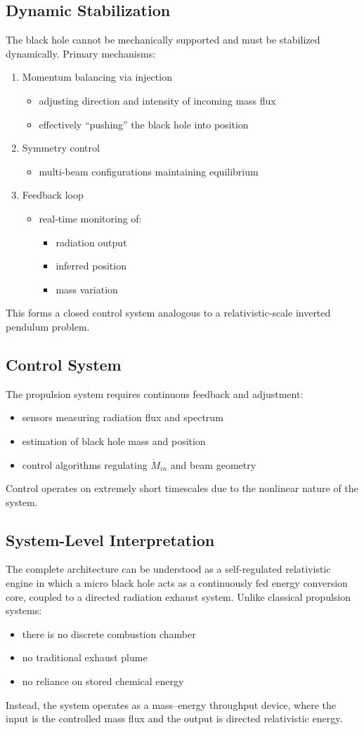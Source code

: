 \documentclass[conference]{IEEEtran}
\begin{document}
\subsection{Dynamic Stabilization}
The black hole cannot be mechanically supported and must be stabilized dynamically.
Primary mechanisms:
\begin{enumerate}
\item Momentum balancing via injection\begin{itemize}\item adjusting direction and intensity of incoming mass flux\item effectively “pushing” the black hole into position\end{itemize}
\item Symmetry control\begin{itemize}\item multi-beam configurations maintaining equilibrium\end{itemize}
\item Feedback loop\begin{itemize}\item real-time monitoring of:\begin{itemize}\item radiation output\item inferred position\item mass variation\end{itemize}\end{itemize}
\end{enumerate}
This forms a closed control system analogous to a relativistic-scale inverted pendulum problem.
\subsection{Control System}
The propulsion system requires continuous feedback and adjustment:
\begin{itemize}
\item sensors measuring radiation flux and spectrum
\item estimation of black hole mass and position
\item control algorithms regulating \( \dot{M}_{in} \) and beam geometry
\end{itemize}
Control operates on extremely short timescales due to the nonlinear nature of the system.
\subsection{System-Level Interpretation}
The complete architecture can be understood as a self-regulated relativistic engine in which a micro black hole acts as a continuously fed energy conversion core, coupled to a directed radiation exhaust system. Unlike classical propulsion systems:
\begin{itemize}
\item there is no discrete combustion chamber
\item no traditional exhaust plume
\item no reliance on stored chemical energy
\end{itemize}
Instead, the system operates as a mass–energy throughput device, where the input is the controlled mass flux and the output is directed relativistic energy.
\end{document}
